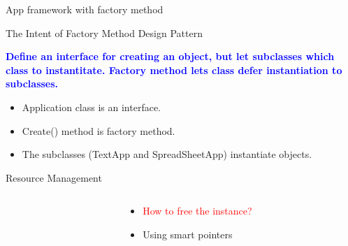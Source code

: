 \documentclass[13pt]{beamer}
\begin{document}
\begin{frame}{App framework with factory method}
\begin{center}
\end{center}
\end{frame}

\begin{frame}{The Intent of Factory Method Design Pattern}
	\begin{center}
	\textcolor{blue}{\textbf{Define an interface for creating an object, but let subclasses which class to instantitate. Factory method lets class defer instantiation to subclasses.}}
	\end{center}
	\begin{itemize}
	\item Application class is an interface.
	\item Create() method is factory method.
	\item The subclasses (TextApp and SpreadSheetApp) instantiate objects.
	\end{itemize}
\end{frame}

\begin{frame}{Resource Management}
\begin{columns}[T]
\begin{column}{.4\textwidth}
\lstset{basicstyle=\tiny,style=myCustomCppStyle}

\end{column}
\begin{column}{.6\textwidth}
	\begin{itemize}
		\setlength\itemsep{1em}
		\item \textcolor{red}{How to free the instance?}
		\item Using smart pointers
	\end{itemize}
\end{column}
\end{columns}
\end{frame}
\end{document}
